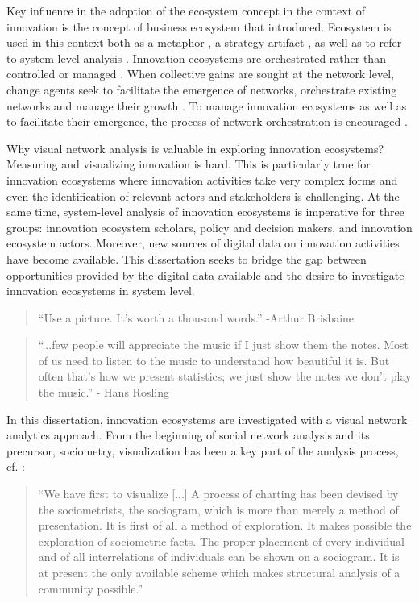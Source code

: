 Key influence in the adoption of the ecosystem concept in the context of innovation is the concept of business ecosystem that \cite{Moore1993PredatorsCompetition} introduced. Ecosystem is used in this context both as a metaphor \citep[e.g.][]{Hwang2012}, a strategy artifact \citep{Moore1993PredatorsCompetition}, as well as to refer to system-level analysis \citep[cf.][]{Pentland2015}. Innovation ecosystems are orchestrated rather than controlled or managed \citep{Russell2011TransformingOrchestration, Ritala2009, Ritala2013}. When collective gains are sought at the network level, change agents seek to facilitate the emergence of networks, orchestrate existing networks and manage their growth \citep{Russell2011TransformingOrchestration}. To manage innovation ecosystems as well as to facilitate their emergence, the process of network orchestration is encouraged \citep{Russell2015RelationalEcosystems}.

Why visual network analysis is valuable in exploring innovation ecosystems? Measuring and visualizing innovation is hard. This is particularly true for innovation ecosystems where innovation activities take very complex forms and even the identification of relevant actors and stakeholders is challenging. At the same time, system-level analysis of innovation ecosystems is imperative for three groups: innovation ecosystem scholars, policy and decision makers, and innovation ecosystem actors. Moreover, new sources of digital data on innovation activities have become available. This dissertation seeks to bridge the gap between opportunities provided by the digital data available and the desire to investigate innovation ecosystems in system level.

\begin{quote}
``Use a picture. It's worth a thousand words.'' -Arthur Brisbaine \citep{Bendoly2016FitAnalytics}
\end{quote}

\begin{quote}
``...few people will appreciate the music if I just show them the notes. Most of us need to listen to the music to understand how beautiful it is. But often that’s how we present statistics; we just show the notes we don’t play the music.'' - Hans Rosling 
\end{quote}

In this dissertation, innovation ecosystems are investigated with a visual network analytics approach. From the beginning of social network analysis and its precursor, sociometry, visualization has been a key part of the analysis process, cf. \cite{Moreno1953}:
\begin{quote}
``We have first to visualize [...] A process of charting has been devised by the sociometrists, the sociogram, which is more than merely a method of presentation. It is first of all a method of exploration. It makes possible the exploration of sociometric facts. The proper placement of every individual and of all interrelations of individuals can be shown on a sociogram. It is at present the only available scheme which makes structural analysis of a community possible.''\end{quote}

